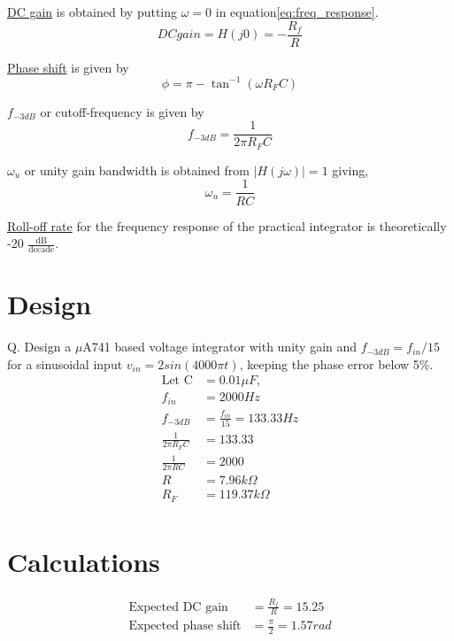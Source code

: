 \documentclass[12pt, titlepage]{article}
\theoremstyle{definition}
\begin{document}
    \underline{DC gain} is obtained by putting $\omega = 0$ in equation\ref{eq:freq_response}.
    \begin{equation}
      DC gain = H(j0) = -\frac{R_f}{R}
    \end{equation}

    \underline{Phase shift} is given by
    \begin{equation}\label{eq:phase_shift}
      \phi = \pi - \tan^{-1}(\omega R_FC)
    \end{equation}

    \underline{$f_{-3dB}$} or cutoff-frequency is given by
    \begin{equation}\label{eq:f3db}
      f_{-3dB} = \frac{1}{2\pi R_FC}
    \end{equation}

    \underline{$\omega_u$} or unity gain bandwidth is obtained from $|H(j\omega)| = 1$ giving,
    \begin{equation}\label{eq:unity_gain_bw}
      \omega_u = \frac{1}{RC}
    \end{equation}

    \underline{Roll-off rate} for the frequency response of the practical integrator is theoretically -20 $\frac{\text{dB}}{\text{decade}}$.

  \newpage
  \section{Design}
    Q. Design a $\mu$A741 based voltage integrator with unity gain and
    $f_{-3dB} = f_{in}/15$ for a sinusoidal input
    $v_{in} = 2 sin(4000\pi t)$, keeping the phase error below 5\%.
    \begin{align*}
        \text{Let C} \! &=0.01\mu F , \\
        f_{in} &=2000 Hz\\
        f_{-3dB} &=\frac{f_{in}}{15} = 133.33 Hz \\
        \frac{1}{2\pi R_{F}C} &= 133.33\\
        \frac{1}{2\pi RC} &= 2000\\
        R &=7.96k\Omega\\
        R_{F} &=119.37k\Omega\\
    \end{align*}


  \section{Calculations}
  \begin{align*}
    \text{Expected DC gain} &= \frac{R_{f}}{R}=15.25\\
    \text{Expected phase shift} &= \frac{\pi}{2}=1.57 rad
  \end{align*}
\end{document}
